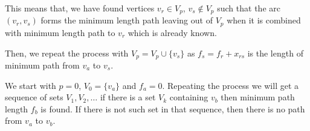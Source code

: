 \begin{commentary}
	This means that, we have found vertices $v_r \in V_p$, $v_s \notin V_p$ such that the arc $(v_r,v_s)$ forms the minimum length path leaving out of $V_p$ when it is combined with minimum length path to $v_r$ which is already known.
\end{commentary}

	Then, we repeat the process with $V_p = V_p \cup \{ v_s \}$ as $f_s = f_r + x_{rs}$ is the length of minimum path from $v_a$ to $v_s$.

	We start with $p = 0$, $V_0 = \{v_a\}$ and $f_a = 0$. Repeating the process we will get a sequence of sets $V_1,V_2,\dots$ if there is a set $V_k$ containing $v_b$ then minimum path length $f_b$ is found. If there is not such set in that sequence, then there is no path from $v_a$ to $v_b$.

